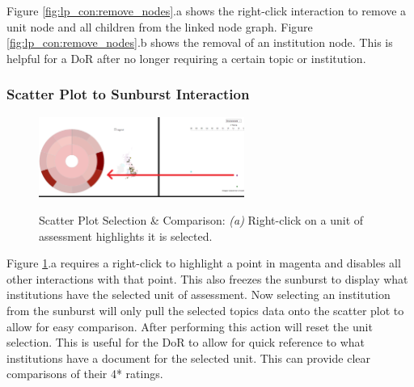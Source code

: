 \documentclass[a4paper, 11pt]{article}
\begin{document}
\noindent Figure \ref{fig:lp_con:remove_nodes}.a shows the right-click interaction to remove a unit node and all children from the linked node graph. Figure \ref{fig:lp_con:remove_nodes}.b shows the removal of an institution node. This is helpful for a DoR after no longer requiring a certain topic or institution.


\subsubsection{Scatter Plot to Sunburst Interaction}
\begin{figure}[hbt!]
	\centering
      \includegraphics[width=0.6\textwidth]{imgs/sc_sb_int/select_UoA_and_compare.png} \\
	\caption{Scatter Plot Selection \& Comparison: 
	\textit{(a)} Right-click on a unit of assessment highlights it is selected.}
    \label{fig:sc_sb_int:uoa_select}
    \noindent\makebox[\linewidth]{\rule{\textwidth}{0.4pt}}
\end{figure}


\noindent Figure \ref{fig:sc_sb_int:uoa_select}.a requires a right-click to highlight a point in magenta and disables all other interactions with that point. This also freezes the sunburst to display what institutions have the selected unit of assessment. Now selecting an institution from the sunburst will only pull the selected topics data onto the scatter plot to allow for easy comparison. After performing this action will reset the unit selection. This is useful for the DoR to allow for quick reference to what institutions have a document for the selected unit. This can provide clear comparisons of their 4* ratings.
\end{document}
